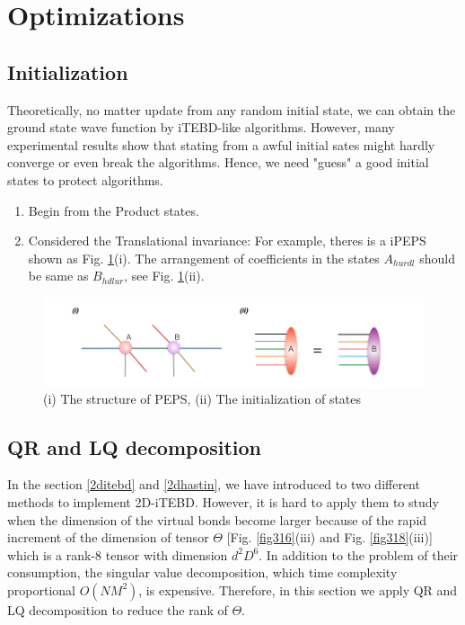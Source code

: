 \section{Optimizations}
\label{2dopt}

\subsection{Initialization}
\label{2doptInit}

Theoretically, no matter update from any random initial state, we can obtain the ground state wave function by iTEBD-like algorithms. However, many experimental results show that stating from a awful initial sates might hardly converge or even break the algorithms. Hence, we need "guess" a good initial states to protect algorithms.

\begin{enumerate}
	\item Begin from the Product states.
	\item Considered the Translational invariance: For example, theres is a iPEPS shown as Fig. \ref{fig321}(i). The arrangement of coefficients in the states $A_{hurdl}$ should be same as $B_{hdlur}$, see Fig. \ref{fig321}(ii).
\end{enumerate}

\begin{figure}[ht]
	\centering
	\includegraphics[width=1.00\textwidth]{figures/fig321.png}
	\caption[The diagrams of initializing projected entangled pair states]{(i) The structure of PEPS, (ii) The initialization of states}
	\label{fig321}
\end{figure}

\subsection{QR and LQ decomposition}
\label{2doptQR} 
In the section \ref{2ditebd} and \ref{2dhastin}, we have introduced to two different methods to implement 2D-iTEBD. However, it is hard to apply them to study when the dimension of the virtual bonds become larger because of the rapid increment of the dimension of tensor $\Theta$ [Fig. \ref{fig316}(iii) and Fig. \ref{fig318}(iii)] which is a rank-8 tensor with dimension $d^2D^6$. In addition to the problem of their consumption, the singular value decomposition, which time complexity proportional $O(NM^2)$, is expensive.  Therefore, in this section we apply QR and LQ decomposition to reduce the rank of $\Theta$.

